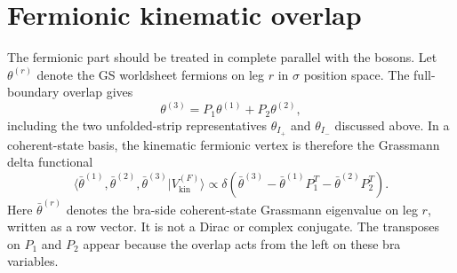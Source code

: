 \documentclass[11pt]{article}
\numberwithin{equation}{section}
\begin{document}
\section{Fermionic kinematic overlap}
The fermionic part should be treated in complete parallel with the bosons. Let $\theta^{(r)}$ denote the GS worldsheet fermions on leg $r$ in $\sigma$ position space. The full-boundary overlap gives
\begin{equation}
\label{eq:s13-001}
\theta^{(3)} = P_1 \theta^{(1)} + P_2 \theta^{(2)},
\end{equation}
including the two unfolded-strip representatives $\theta_{I_+}$ and $\theta_{I_-}$ discussed above. In a coherent-state basis, the kinematic fermionic vertex is therefore the Grassmann delta functional
\begin{equation}
\label{eq:s13-002}
\langle \bar\theta^{(1)},\bar\theta^{(2)},\bar\theta^{(3)} | V^{(F)}_{\mathrm{kin}} \rangle
\propto
\delta\!\left(\bar\theta^{(3)}-\bar\theta^{(1)}P_1^T-\bar\theta^{(2)}P_2^T\right).
\end{equation}
Here $\bar\theta^{(r)}$ denotes the bra-side coherent-state Grassmann eigenvalue on leg $r$, written as a row vector. It is not a Dirac or complex conjugate. The transposes on $P_1$ and $P_2$ appear because the overlap acts from the left on these bra variables.
\end{document}
